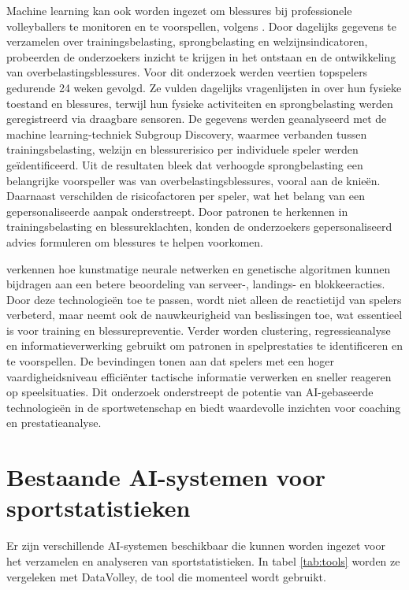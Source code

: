 Machine learning kan ook worden ingezet om blessures bij professionele volleyballers te monitoren en te voorspellen, volgens \textcite{Leeuw2021}. Door dagelijks gegevens te verzamelen over trainingsbelasting, sprongbelasting en welzijnsindicatoren, probeerden de onderzoekers inzicht te krijgen in het ontstaan en de ontwikkeling van overbelastingsblessures.
Voor dit onderzoek werden veertien topspelers gedurende 24 weken gevolgd. Ze vulden dagelijks vragenlijsten in over hun fysieke toestand en blessures, terwijl hun fysieke activiteiten en sprongbelasting werden geregistreerd via draagbare sensoren. De gegevens werden geanalyseerd met de machine learning-techniek Subgroup Discovery, waarmee verbanden tussen trainingsbelasting, welzijn en blessurerisico per individuele speler werden geïdentificeerd.
Uit de resultaten bleek dat verhoogde sprongbelasting een belangrijke voorspeller was van overbelastingsblessures, vooral aan de knieën. Daarnaast verschilden de risicofactoren per speler, wat het belang van een gepersonaliseerde aanpak onderstreept. Door patronen te herkennen in trainingsbelasting en blessureklachten, konden de onderzoekers gepersonaliseerd advies formuleren om blessures te helpen voorkomen.

\textcite{Yu2022} verkennen hoe kunstmatige neurale netwerken en genetische algoritmen kunnen bijdragen aan een betere beoordeling van serveer-, landings- en blokkeeracties. Door deze technologieën toe te passen, wordt niet alleen de reactietijd van spelers verbeterd, maar neemt ook de nauwkeurigheid van beslissingen toe, wat essentieel is voor training en blessurepreventie.
Verder worden clustering, regressieanalyse en informatieverwerking gebruikt om patronen in spelprestaties te identificeren en te voorspellen. De bevindingen tonen aan dat spelers met een hoger vaardigheidsniveau efficiënter tactische informatie verwerken en sneller reageren op speelsituaties. Dit onderzoek onderstreept de potentie van AI-gebaseerde technologieën in de sportwetenschap en biedt waardevolle inzichten voor coaching en prestatieanalyse.

\section{Bestaande AI-systemen voor sportstatistieken}
Er zijn verschillende AI-systemen beschikbaar die kunnen worden ingezet voor het verzamelen en analyseren van sportstatistieken. In tabel \ref{tab:tools} worden ze vergeleken met DataVolley, de tool die momenteel wordt gebruikt.

